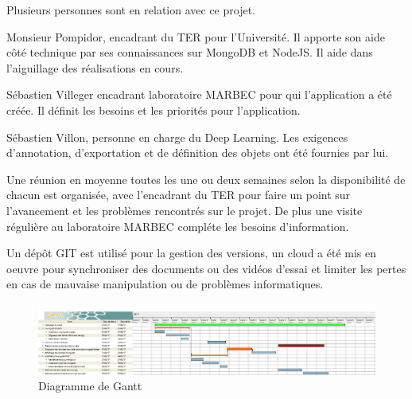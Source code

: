 \documentclass[12pt]{article}
\begin{document}
Plusieurs personnes sont en relation avec ce projet.
\par
Monsieur Pompidor, encadrant du TER pour l'Université. Il apporte son aide côté technique par ses connaissances sur MongoDB et NodeJS. Il aide dans l’aiguillage des réalisations en cours.
\par
Sébastien Villeger encadrant laboratoire MARBEC pour qui l’application a été créée. Il définit les besoins et les priorités pour l’application.
\par
Sébastien Villon, personne en charge du Deep Learning. Les exigences d’annotation, d’exportation et de définition des objets ont été fournies par lui.
\par
Une réunion en moyenne toutes les une ou deux semaines selon la disponibilité de chacun est organisée, avec l’encadrant du TER pour faire un point sur l’avancement et les problèmes rencontrés sur le projet. De plus une visite régulière au laboratoire MARBEC compléte les besoins d’information.
\par
Un dépôt GIT est utilisé pour la gestion des versions, un cloud a été mis en oeuvre pour synchroniser des documents ou des vidéos d’essai et limiter les pertes en cas de mauvaise manipulation ou de problèmes informatiques.

\begin{figure}[H]
\centering
\includegraphics[width=1\textwidth]{img/gantt_oia.png}
 \caption{Diagramme de Gantt}
 \label{fig:gantt}
\end{figure}
\end{document}
